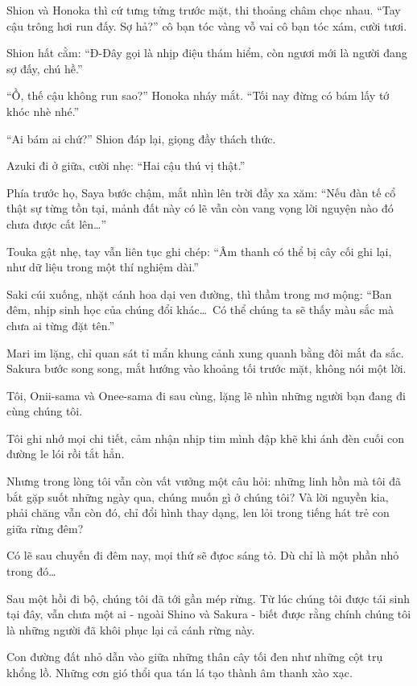 \documentclass[../main.tex]{subfiles}
\begin{document}
Shion và Honoka thì cứ tưng tửng trước mặt, thi thoảng châm chọc nhau. ``Tay cậu trông hơi run đấy. Sợ hả?'' cô bạn tóc vàng vỗ vai cô bạn tóc xám, cười tươi.

Shion hất cằm: ``Đ-Đây gọi là nhịp điệu thám hiểm, còn ngươi mới là người đang sợ đấy, chú hề.''

``Ồ, thế cậu không run sao?'' Honoka nháy mắt. ``Tối nay đừng có bám lấy tớ khóc nhè nhé.''

``Ai bám ai chứ?'' Shion đáp lại, giọng đầy thách thức.

Azuki đi ở giữa, cười nhẹ: ``Hai cậu thú vị thật.''

Phía trước họ, Saya bước chậm, mắt nhìn lên trời đầy xa xăm: ``Nếu đàn tế cổ thật sự từng tồn tại, mảnh đất này có lẽ vẫn còn vang vọng lời nguyện nào đó chưa được cất lên\dots''

Touka gật nhẹ, tay vẫn liên tục ghi chép: ``Âm thanh có thể bị cây cối ghi lại, như dữ liệu trong một thí nghiệm dài.''

Saki cúi xuống, nhặt cánh hoa dại ven đường, thì thầm trong mơ mộng: ``Ban đêm, nhịp sinh học của chúng đổi khác\dots\ Có thể chúng ta sẽ thấy màu sắc mà chưa ai từng đặt tên.''

Mari im lặng, chỉ quan sát tỉ mẩn khung cảnh xung quanh bằng đôi mắt đa sắc. Sakura bước song song, mắt hướng vào khoảng tối trước mặt, không nói một lời.

Tôi, Onii-sama và Onee-sama đi sau cùng, lặng lẽ nhìn những người bạn đang đi cùng chúng tôi.

Tôi ghi nhớ mọi chi tiết, cảm nhận nhịp tim mình đập khẽ khi ánh đèn cuối con đường le lói rồi tắt hẳn.

Nhưng trong lòng tôi vẫn còn vất vưởng một câu hỏi: những linh hồn mà tôi đã bắt gặp suốt những ngày qua, chúng muốn gì ở chúng tôi? Và lời nguyền kia, phải chăng vẫn còn đó, chỉ đổi hình thay dạng, len lỏi trong tiếng hát trẻ con giữa rừng đêm?

Có lẽ sau chuyến đi đêm nay, mọi thứ sẽ đựoc sáng tỏ. Dù chỉ là một phần nhỏ trong đó\dots

\ct

Sau một hồi đi bộ, chúng tôi đã tới gần mép rừng. Từ lúc chúng tôi được tái sinh tại đây, vẫn chưa một ai - ngoài Shino và Sakura - biết được rằng chính chúng tôi là những người đã khôi phục lại cả cánh rừng này.

Con đường đất nhỏ dẫn vào giữa những thân cây tối đen như những cột trụ khổng lồ. Những cơn gió thổi qua tán lá tạo thành âm thanh xào xạc.
\end{document}
